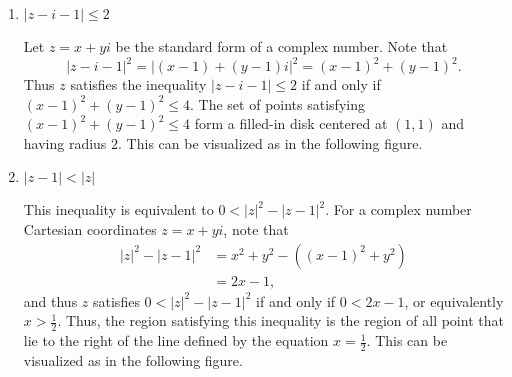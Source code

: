 \documentclass[11pt]{article}
\newcommand{\abs}[1]{\left|#1\right|}
\begin{document}
\begin{enumerate}
\begin{enumerate}
 \item $\abs{z-i-1}\leq2$
 \begin{Solution}
  Let $z=x+yi$ be the standard form of a complex number. Note that 
  \[
   \abs{z-i-1}^2 = \abs{(x-1) + (y-1)i}^2  = (x-1)^2 + (y-1)^2.
  \]
Thus $z$ satisfies the inequality $\abs{z-i-1}\leq2$ if and only if $(x-1)^2 + (y-1)^2\leq 4$. The set of points satisfying $(x-1)^2 + (y-1)^2\leq 4$ form a filled-in disk centered at $(1,1)$ and having radius $2$. This can be visualized as in the following figure.
\begin{center}
\end{center}
 \end{Solution}

 \item $\abs{z-1}<\abs{z}$
 \begin{Solution}
  This inequality is equivalent to $0<\abs{z}^2-\abs{z-1}^2$. For a complex number Cartesian coordinates $z=x+yi$, note that
  \begin{align*}
   \abs{z}^2-\abs{z-1}^2 &= x^2+y^2 - \left((x-1)^2 + y^2\right)\\
			   &= 2x-1,
  \end{align*}
  and thus $z$ satisfies $0<\abs{z}^2-\abs{z-1}^2$ if and only if $0<2x-1$, or equivalently $x>\frac{1}{2}$.
Thus, the region satisfying this inequality is the region of all point that lie to the right of the line defined by the equation $x=\frac{1}{2}$. This can be visualized as in the following figure.
\begin{center}
\end{center}
 \end{Solution}


\end{enumerate}
\end{enumerate}
\end{document}
